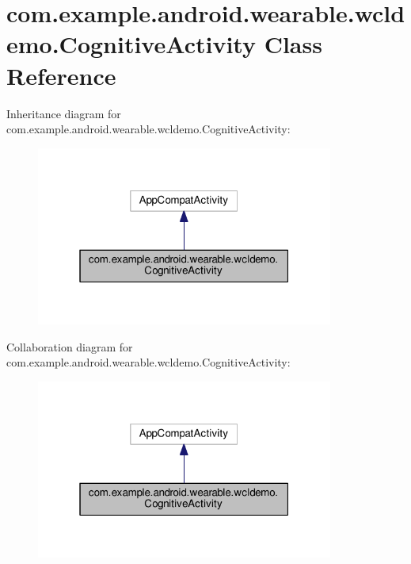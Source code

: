 \hypertarget{classcom_1_1example_1_1android_1_1wearable_1_1wcldemo_1_1CognitiveActivity}{}\section{com.\+example.\+android.\+wearable.\+wcldemo.\+Cognitive\+Activity Class Reference}
\label{classcom_1_1example_1_1android_1_1wearable_1_1wcldemo_1_1CognitiveActivity}


Inheritance diagram for com.\+example.\+android.\+wearable.\+wcldemo.\+Cognitive\+Activity\+:\nopagebreak
\begin{figure}[H]
\begin{center}
\leavevmode
\includegraphics[width=277pt]{d1/d46/classcom_1_1example_1_1android_1_1wearable_1_1wcldemo_1_1CognitiveActivity__inherit__graph}
\end{center}
\end{figure}


Collaboration diagram for com.\+example.\+android.\+wearable.\+wcldemo.\+Cognitive\+Activity\+:\nopagebreak
\begin{figure}[H]
\begin{center}
\leavevmode
\includegraphics[width=277pt]{dd/d2a/classcom_1_1example_1_1android_1_1wearable_1_1wcldemo_1_1CognitiveActivity__coll__graph}
\end{center}
\end{figure}
